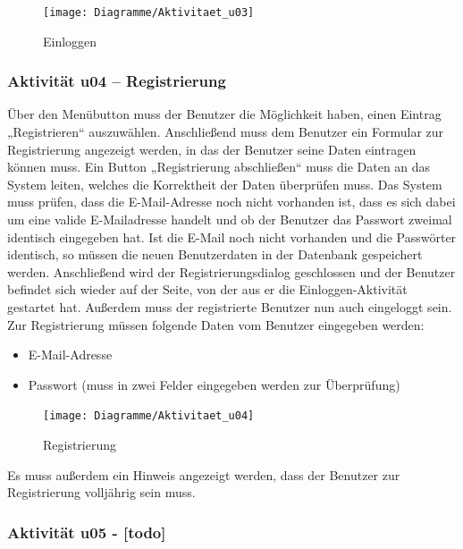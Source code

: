\documentclass[a4paper,12pt,oneside]{scrartcl}
\begin{document}
\begin{figure}[!htbp]
\centering
\noindent\texttt{[image: Diagramme/Aktivitaet\_u03]}
\caption{Einloggen}
\end{figure}
\FloatBarrier


\subsubsection{Aktivität u04 – Registrierung}
Über den Menübutton muss der Benutzer die Möglichkeit haben, einen Eintrag „Registrieren“ auszuwählen. Anschließend muss dem Benutzer ein Formular zur Registrierung angezeigt werden, in das der Benutzer seine Daten eintragen können muss. Ein Button „Registrierung abschließen“ muss die Daten an das System leiten, welches die Korrektheit der Daten überprüfen muss. Das System muss prüfen, dass die E-Mail-Adresse noch nicht vorhanden ist, dass es sich dabei um eine valide E-Mailadresse handelt und ob der Benutzer das Passwort zweimal identisch eingegeben hat. Ist die E-Mail noch nicht vorhanden und die Passwörter identisch, so müssen die neuen Benutzerdaten in der Datenbank gespeichert werden. Anschließend wird der Registrierungsdialog geschlossen und der Benutzer befindet sich wieder auf der Seite, von der aus er die Einloggen-Aktivität gestartet hat. Außerdem muss der registrierte Benutzer nun auch eingeloggt sein.
Zur Registrierung müssen folgende Daten vom Benutzer eingegeben werden:
\begin{itemize}
	\item E-Mail-Adresse
	\item Passwort (muss in zwei Felder eingegeben werden zur Überprüfung)
\end{itemize}

\begin{figure}[!htbp]
\centering
\noindent\texttt{[image: Diagramme/Aktivitaet\_u04]}
\caption{Registrierung}
\end{figure}
\FloatBarrier
Es muss außerdem ein Hinweis angezeigt werden, dass der Benutzer zur Registrierung volljährig sein muss.


\subsubsection{Aktivität u05 - [todo]}
\end{document}
